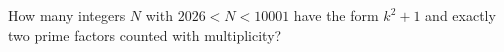 How many integers $N$ with $2026<N<10001$ have the form $k^2+1$ and exactly two prime factors counted with multiplicity?
